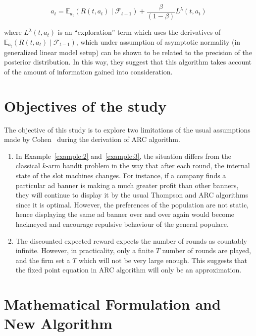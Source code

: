 \documentclass[11pt]{article}
\newcommand{\E}{\mathbb{E}}
\newcommand{\Fcal}{\mathcal{F}}
\begin{document}
$$
a_t = \E_{a_t}(R(t, a_t)\mid \Fcal_{t-1}) + \dfrac{\beta}{(1 - \beta)} L^\lambda(t, a_t)
$$

\noindent where $L^\lambda(t, a_t)$ is an ``exploration'' term which uses the derivatives of $\E_{a_t}(R(t, a_t)\mid \Fcal_{t-1})$, which under assumption of asymptotic normality (in generalized linear model setup) can be shown to be related to the precision of the posterior distribution. In this way, they suggest that this algorithm takes account of the amount of information gained into consideration.

\section{Objectives of the study}

The objective of this study is to explore two limitations of the usual assumptions made by Cohen~\cite{cohen2020asymptotic,treetanthiploet2021correlated} during the derivation of ARC algorithm.

\begin{enumerate}
    \item In Example~\ref{example:2} and~\ref{example:3}, the situation differs from the classical $k$-arm bandit problem in the way that after each round, the internal state of the slot machines changes. For instance, if a company finds a particular ad banner is making a much greater profit than other banners, they will continue to display it by the usual Thompson and ARC algorithms since it is optimal. However, the preferences of the population are not static, hence displaying the same ad banner over and over again would become hackneyed and encourage repulsive behaviour of the general populace.
    \item The discounted expected reward expects the number of rounds as countably infinite. However, in practicality, only a finite $T$ number of rounds are played, and the firm set a $T$ which will not be very large enough. This suggests that the fixed point equation in ARC algorithm will only be an approximation.
\end{enumerate}

\section{Mathematical Formulation and New Algorithm}
\end{document}
